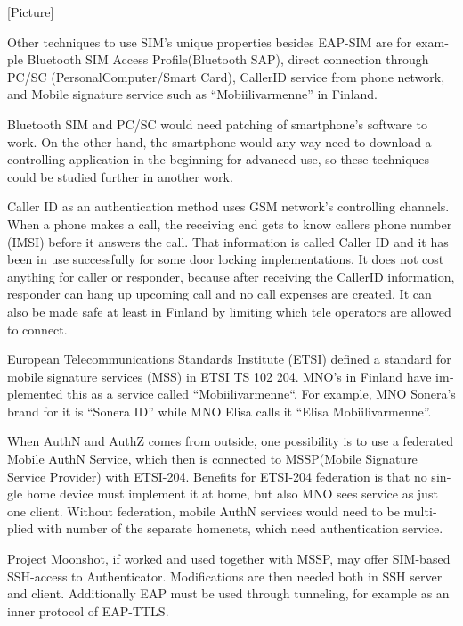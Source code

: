 \documentclass[12pt,a4paper,english]{tutthesis}
\begin{document}
\begin{otherlanguage}{english}
[Picture]

Other techniques  to use SIM's unique properties besides EAP-SIM
are for example Bluetooth SIM Access Profile(Bluetooth  SAP), 
direct connection through PC/SC (Personal\-Computer/Smart\- Card),
CallerID service from phone network, and
Mobile signature service such as ``Mobiilivarmenne'' in Finland.



Bluetooth SIM and PC/SC would need patching of smartphone's software
to work.  On the other hand, the smartphone would any way need to
download  a controlling application
in the beginning for advanced use, so these techniques could be
studied further in another work.

Caller ID as an authentication method uses GSM network's controlling
channels. When a phone makes a call, the receiving end gets 
to know callers phone number (IMSI) before it answers the call.
That information is called Caller ID and it has been in use
successfully for some door locking implementations. 
It does not cost anything for caller or responder,
because after receiving the CallerID  information, responder can hang
up upcoming call and no call expenses are created.
 It can also be made safe at least in Finland
by limiting which tele operators are allowed to connect.
















European Telecommunications Standards Institute (ETSI) defined a
standard for mobile signature services (MSS) in ETSI TS 102 204.
MNO's in Finland have implemented this as a 
service called ``Mobiilivarmenne``. 
For example, MNO Sonera's brand for  it is ``Sonera ID'' while MNO Elisa calls it
``Elisa Mobiilivarmenne''.

When AuthN and AuthZ comes from outside, one possibility is to use a
federated Mobile AuthN Service, which then is connected to MSSP(Mobile
Signature Service Provider) with ETSI-204. Benefits for ETSI-204
federation is that no single home device must implement it at home,
but also MNO sees service as just one client.  Without federation,
mobile AuthN services would need to be multiplied with number of the
separate homenets, which need authentication service.



Project Moonshot, if worked and used together with MSSP, may offer
SIM-based SSH-access to Authenticator. Modifications are then needed 
both in SSH server and client. Additionally EAP must be used through
tunneling, for example as an inner protocol of EAP-TTLS.\cite{moonshot}


\end{otherlanguage}
\end{document}
